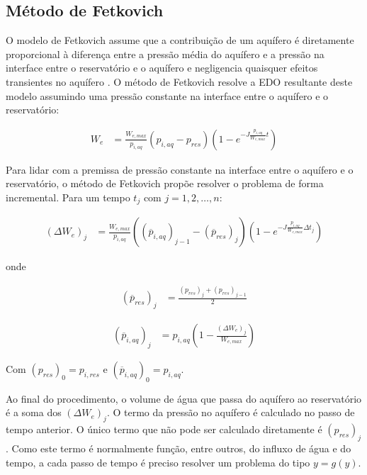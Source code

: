 \documentclass[final,5p]{elsarticle}
\numberwithin{equation}{section}
\begin{document}
    \subsection{Método de Fetkovich}

        O modelo de Fetkovich assume que a contribuição de um aquífero é diretamente proporcional à diferença entre a pressão média do aquífero e a pressão na interface entre o reservatório e o aquífero e negligencia quaisquer efeitos transientes no aquífero \cite{fetkovich1971simplified}. O método de Fetkovich resolve a EDO resultante deste modelo assumindo uma pressão constante na interface entre o aquífero e o reservatório:

        \begin{align}
            W_e &= \frac{W_{e,max}}{p_{i,aq}} (p_{i,aq} - p_{res}) \left( 1- e^{-J\frac{p_{i,aq}}{W_{e,max}} t} \right) \label{eq:we}
        \end{align}

        Para lidar com a premissa de pressão constante na interface entre o aquífero e o reservatório, o método de Fetkovich propõe resolver o problema de forma incremental. Para um tempo $t_j$ com $j=1,2,\ldots,n$:

        \begin{align}
            (\Delta W_e)_j &= \frac{W_{e,max}}{p_{i,aq}} ((\overline{p}_{i,aq})_{j-1} - (\overline{p}_{res})_j) \left( 1- e^{-J\frac{p_{i,aq}}{W_{e,max}} \Delta t_j} \right) \label{eq:deltawe}
        \end{align}

        \noindent
        onde

        \begin{align}
            (\overline{p}_{res})_j &= \frac{(p_{res})_j + (p_{res})_{j-1}}{2} \label{eq:presmedio}
        \end{align}

        \begin{align}
            (\overline{p}_{i,aq})_j &= p_{i,aq} \left( 1 - \frac{(\Delta W_e)_j}{W_{e,max}} \right) \label{eq:paqmedio}
        \end{align}

        Com $(p_{res})_0 = p_{i,res}$ e $(\overline{p}_{i,aq})_0 = p_{i,aq}$.

        Ao final do procedimento, o volume de água que passa do aquífero ao reservatório é a soma dos $(\Delta W_e)_j$. O termo da pressão no aquífero é calculado no passo de tempo anterior. O único termo que não pode ser calculado diretamente é $(p_{res})_j$. Como este termo é normalmente função, entre outros, do influxo de água e do tempo, a cada passo de tempo é preciso resolver um problema do tipo $y = g(y)$.
\end{document}
